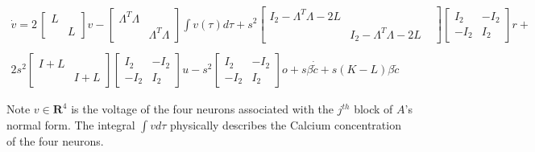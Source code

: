 \begin{itemize}
\begin{align*}
\dot{v} = 2\, \begin{bmatrix}
L & 
\\
& L
\end{bmatrix}
v
-
\begin{bmatrix}
\Lambda^T \Lambda &
\\
&\Lambda^T \Lambda
\end{bmatrix}
\int v(\tau) d\tau 
+
s^2
\begin{bmatrix}
I_2 - \Lambda^T \Lambda - 2L &
\\
& I_2 - \Lambda^T \Lambda - 2L &
\end{bmatrix}
\begin{bmatrix}
I_2& -I_2
\\
-I_2 & I_2
\end{bmatrix}
r
+ 
\\
\\
2 s^2
\begin{bmatrix}
I + L &
\\
&I + L
\end{bmatrix}
\begin{bmatrix}
I_2& -I_2
\\
-I_2& I_2
\end{bmatrix}
u
-
s^2
\begin{bmatrix}
I_2& -I_2
\\
-I_2& I_2
\end{bmatrix}
o
+ s \beta \dot{\tilde{c}} + s(K - L)\beta \tilde{c}
\end{align*}

Note $v \in \mathbf{R}^4$ is the voltage of the four neurons associated with the $j^{th}$ block of $A$'s normal form. The integral $\int v d\tau$ physically describes the Calcium concentration of the four neurons.
\end{itemize}




